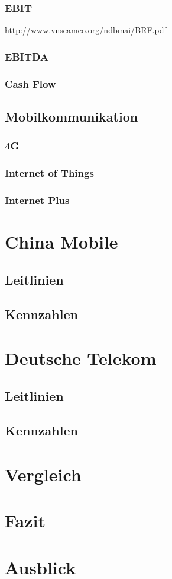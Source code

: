 \documentclass[12pt, a4paper]{article}
\begin{document}
\subsubsection{EBIT}

\url{http://www.vnseameo.org/ndbmai/BRF.pdf}


\subsubsection{EBITDA}

\subsubsection{Cash Flow}

\subsection{Mobilkommunikation}

\subsubsection{4G}
\subsubsection{Internet of Things}
\subsubsection{Internet Plus}

\section{China Mobile}
\subsection{Leitlinien}
\subsection{Kennzahlen}
\section{Deutsche Telekom}
\subsection{Leitlinien}
\subsection{Kennzahlen}
\section{Vergleich}
\label{sec:vergleich}
\section{Fazit}
\section{Ausblick}

\medskip



\end{document}
